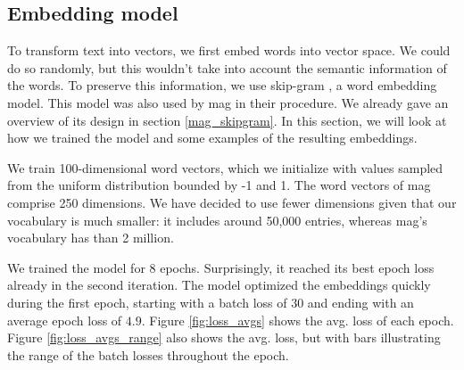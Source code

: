 \subsection{Embedding model} \label{implementation_skipgram}

To transform text into vectors, we first embed words into vector space. We could do so randomly, but this wouldn't take into account the semantic information of the words. To preserve this information, we use skip-gram \cite{mikolov2013distributed}, a word embedding model. This model was also used by \acrshort{mag} in their procedure. We already gave an overview of its design in section \ref{mag_skipgram}. In this section, we will look at how we trained the model and some examples of the resulting embeddings.

We train 100-dimensional word vectors, which we initialize with values sampled from the uniform distribution bounded by -1 and 1. The word vectors of \acrshort{mag} comprise 250 dimensions. We have decided to use fewer dimensions given that our vocabulary is much smaller: it includes around 50,000 entries, whereas \acrshort{mag}'s vocabulary has than 2 million.

We trained the model for 8 epochs. Surprisingly, it reached its best epoch loss already in the second iteration. The model optimized the embeddings quickly during the first epoch, starting with a batch loss of $30$ and ending with an average epoch loss of $4.9$. Figure \ref{fig:loss_avgs} shows the avg. loss of each epoch. Figure \ref{fig:loss_avgs_range} also shows the avg. loss, but with bars illustrating the range of the batch losses throughout the epoch.

